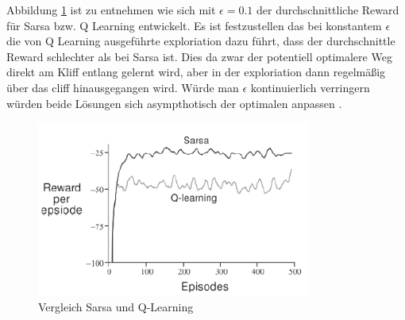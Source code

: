\documentclass[10pt]{scrartcl}
\begin{document}
Abbildung \ref{fig:Cliff_Result} ist zu entnehmen wie sich mit $\epsilon = 0.1$ der durchschnittliche Reward für Sarsa bzw. Q Learning entwickelt. Es ist festzustellen das bei konstantem $\epsilon$ die von Q Learning ausgeführte exploriation dazu führt, dass der durchschnittle Reward schlechter als bei Sarsa ist. Dies da zwar der potentiell optimalere Weg direkt am Kliff entlang gelernt wird, aber in der exploriation dann regelmäßig über das cliff hinausgegangen wird. Würde man $\epsilon$ kontinuierlich verringern würden beide Lösungen sich asympthotisch der optimalen anpassen \cite[Vgl.][S. 186,187]{sutton:2005}. 

\begin{figure}[htbp]
	\centering	\includegraphics[width=0.8\textwidth]{Bilder/Cliff_Ergebnisse.png}
	\caption{Vergleich Sarsa und Q-Learning \cite[Vgl.][S. 186]{sutton:2005}}
	\label{fig:Cliff_Result}
\end{figure}


\end{document}
